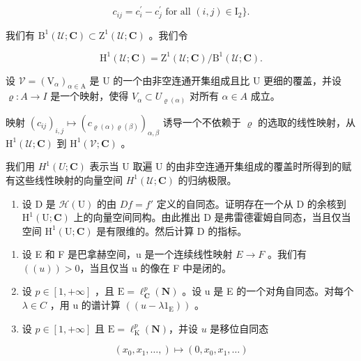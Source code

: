 \[
c _ {i j} = c _ {i} ^ {\prime} - c _ {j} ^ {\prime} \text {   for all   } (i, j) \in \mathrm{I} _ {2} \}.
\]

我们有 \(\mathrm{B}^1 (\mathcal{U};\mathbf{C})\subset \mathrm{Z}^1 (\mathcal{U};\mathbf{C})\) 。我们令

\[
\mathrm{H} ^ {1} (\mathcal {U}; \mathbf {C}) = \mathrm{Z} ^ {1} (\mathcal {U}; \mathbf {C}) / \mathrm{B} ^ {1} (\mathcal {U}; \mathbf {C}).
\]

设 \(\mathcal{V}=(\mathrm{V}_{\alpha})_{\alpha\in\mathrm{A}}\) 是 U 的一个由非空连通开集组成且比 U 更细的覆盖，并设 \(\varrho\colon A\to I\) 是一个映射，使得 \(V_{\alpha}\subset U_{\varrho(\alpha)}\) 对所有 \(\alpha\in A\) 成立。

映射 \((c_{ij})_{i,j} \mapsto (c_{\varrho(\alpha)\varrho(\beta)})_{\alpha,\beta}\) 诱导一个不依赖于 \(\varrho\) 的选取的线性映射，从 \(\mathrm{H}^1(\mathcal{U};\mathbf{C})\) 到 \(\mathrm{H}^1(\mathcal{V};\mathbf{C})\) 。

我们用 \(H^{1}(U; \mathbf{C})\) 表示当 U 取遍 U 的由非空连通开集组成的覆盖时所得到的赋有这些线性映射的向量空间 \(H^{1}(\mathcal{U}; \mathbf{C})\) 的归纳极限。

\begin{enumerate}
\def\labelenumi{\alph{enumi})}
\setcounter{enumi}{2}
\tightlist
\item
  设 D 是 \(\mathcal{H}(\mathrm{U})\) 的由 \(Df = f'\) 定义的自同态。证明存在一个从 D 的余核到 \(\mathrm{H}^1 (\mathrm{U};\mathbf{C})\) 上的向量空间同构。由此推出 D 是弗雷德霍姆自同态，当且仅当空间 \(\mathrm{H}^1 (\mathrm{U};\mathbf{C})\) 是有限维的。然后计算 D 的指标。
\end{enumerate}

\exercisesection{}

\begin{enumerate}
\def\labelenumi{\arabic{enumi})}
\item
  设 E 和 F 是巴拿赫空间，u 是一个连续线性映射 \(E \rightarrow F\) 。我们有 \(((u)) > 0\)，当且仅当 u 的像在 F 中是闭的。
\item
  设 \(p \in [1, +\infty]\) ，且 \(\mathrm{E} = \ell_{\mathbf{C}}^{p}(\mathbf{N})\) 。设 u 是 E 的一个对角自同态。对每个 \(\lambda \in C\) ，用 u 的谱计算 \(((u - \lambda 1_{\mathrm{E}}))\) 。
\item
  设 \(p \in [1, +\infty]\) 且 \(\mathrm{E} = \ell_{\mathrm{K}}^{p}(\mathbf{N})\)，并设 \(u\) 是移位自同态
\end{enumerate}

\[
(x _ {0}, x _ {1}, \dots ,) \mapsto (0, x _ {0}, x _ {1}, \dots)
\]

